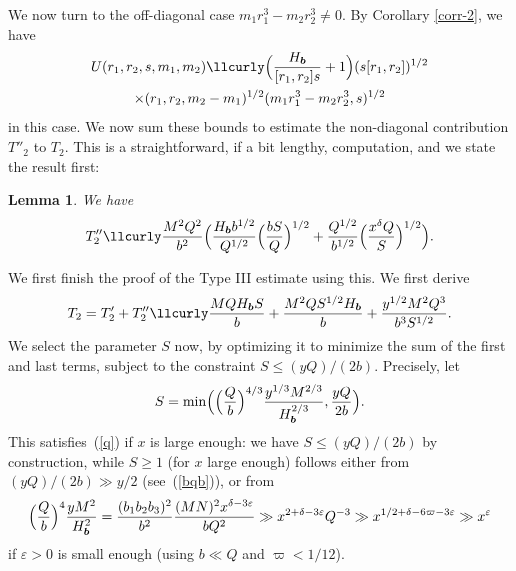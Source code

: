 \documentclass[12pt,a4paper,reqno]{amsart}
\numberwithin{equation}{section}
\theoremstyle{plain}
\newtheorem{lemma}[theorem]{Lemma}
\theoremstyle{definition}
\newcommand\eps{\varepsilon}
\newcommand\Scal{\mathcal{S}}
\newcommand{\uple}[1]{\text{\boldmath${#1}$}}
\def\stacksum#1#2{{\stackrel{{\scriptstyle #1}}
{{\scriptstyle #2}}}}
\newcommand\sumsum{\mathop{\sum\sum}\limits}
\renewcommand{\sim}{\asymp}
\renewcommand{\lessapprox}{\llcurly}
\begin{document}

We now turn to the off-diagonal case $m_1 r_1^3 - m_2 r_2^3 \neq 0$.
By Corollary \ref{corr-2}, we have
\begin{multline*}
U(r_1,r_2,s,m_1,m_2)\lessapprox
\Bigl(\frac{H_{\uple{b}}}{[r_1,r_2]s}+1\Bigr)
(s[r_1,r_2])^{1/2}\\
\times (r_1,r_2,m_2-m_1)^{1/2}
(m_1r_1^3-m_2r_2^3,s)^{1/2}
\end{multline*}
in this case. We now sum
these bounds to estimate the non-diagonal contribution $T''_2$ to
$T_2$. This is a straightforward, if a bit lengthy, computation, and
we state the result first:

\begin{lemma}\label{lm-sumup}
We have
$$
T''_2\lessapprox \frac{M^2Q^2}{b^2}\Bigl(
\frac{H_{\uple{b}}b^{1/2}}{Q^{1/2}}\Bigl(\frac{bS}{Q}\Bigr)^{1/2}
+\frac{Q^{1/2}}{b^{1/2}}\Bigl(\frac{x^{\delta}Q}{S}\Bigr)^{1/2} \Bigr).
$$
\end{lemma}

We first finish the proof of the Type III estimate using this. We
first derive
$$
T_2=T'_2+T''_2\lessapprox \frac{MQH_{\uple{b}}S}{b}+
\frac{M^2QS^{1/2}H_{\uple{b}}}{b}+ \frac{y^{1/2}M^2Q^3}{b^3S^{1/2}}.
$$
We select the parameter $S$ now, by optimizing it to minimize the sum
of the first and last terms, subject to the constraint $S \leq (yQ)/(2b)$. Precisely, let
$$
S=\min\Bigl(\Bigl(\frac{Q}{b}\Bigr)^{4/3}\frac{y^{1/3}M^{2/3}}{H_{\uple{b}}^{2/3}},
\frac{yQ}{2b}\Bigr).
$$
This satisfies~(\ref{q}) if $x$ is large enough: we have $S\leq
(yQ)/(2b)$ by construction, while $S\geq 1$ (for $x$ large enough)
follows either from $(yQ)/(2b)\gg y/2$ (see~(\ref{bqb})), or from
$$
\Bigl(\frac{Q}{b}\Bigr)^{4}\frac{yM^{2}}{H_{\uple{b}}^{2}}=
\frac{(b_1b_2b_3)^2}{b^2} \frac{(MN)^2x^{\delta-3\eps}}{bQ^2} \gg
x^{2+\delta-3\eps}Q^{-3}\gg x^{1/2+\delta-6\varpi-3\eps}\gg x^\eps
$$
if $\eps>0$ is small enough (using $b\ll Q$ and $\varpi<1/12$). 
\end{document}
